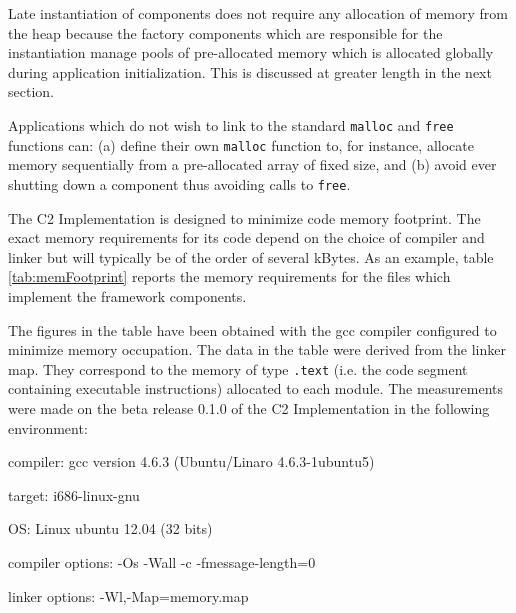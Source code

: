 \documentclass[a4paper,10pt]{article}
\newenvironment{fw_itemize}						%
{\begin{itemize}
  \setlength{\itemsep}{1mm}
  \setlength{\parskip}{0pt}
  \setlength{\parsep}{0pt}}
{\end{itemize}}
\begin{document}
Late instantiation of components does not require any allocation of memory from the heap because the factory components which are responsible for the instantiation manage pools of pre-allocated memory which is allocated globally during application initialization. This is discussed at greater length in the next section.

Applications which do not wish to link to the standard \texttt{malloc} and \texttt{free} functions can: (a) define their own \texttt{malloc} function to, for instance, allocate memory sequentially from a pre-allocated array of fixed size, and (b) avoid ever shutting down a component thus avoiding calls to \texttt{free}. 

The C2 Implementation is designed to minimize code memory footprint. The exact memory requirements for its code depend on the choice of compiler and linker but will typically be of the order of several kBytes. As an example, table \ref{tab:memFootprint} reports the memory requirements for the files which implement the framework components. 

The figures in the table have been obtained with the gcc compiler configured to minimize memory occupation. The data in the table were derived from the linker map. They correspond to the memory of type \texttt{.text} (i.e. the code segment containing executable instructions) allocated to each module. The measurements were made on the beta release 0.1.0 of the C2 Implementation in the following environment:

\begin{fw_itemize}
\item{compiler}: gcc version 4.6.3 (Ubuntu/Linaro 4.6.3-1ubuntu5)
\item{target}: i686-linux-gnu
\item{OS}: Linux ubuntu 12.04 (32 bits)
\item{compiler options}: -Os -Wall -c -fmessage-length=0
\item{linker options}: -Wl,-Map=memory.map
\end{fw_itemize}
\end{document}
